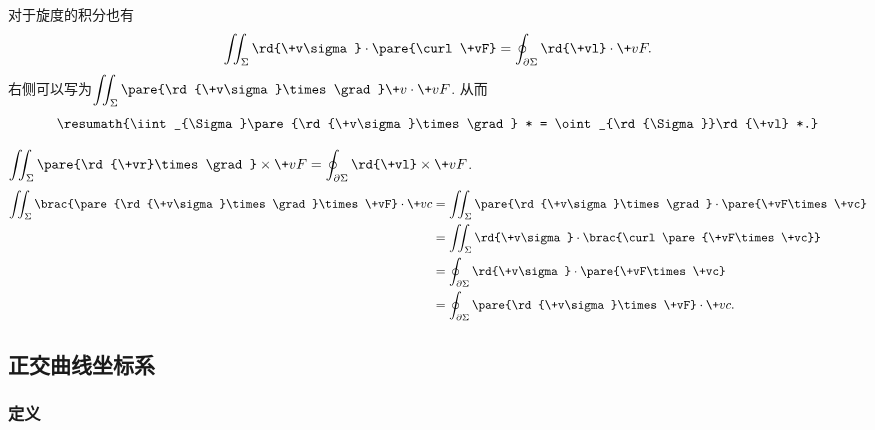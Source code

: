 \documentclass[hidelinks]{ctexart}
\begin{document}
\par
对于旋度的积分也有
\[ \iint_{\Sigma} \rd{\+v\sigma} \cdot\pare{\curl\+vF} = \oint_{\partial\Sigma} \rd{\+vl}\cdot \+vF. \]
右侧可以写为$\displaystyle \iint_{\Sigma} \pare{\rd{\+v\sigma}\times \grad}\+v\cdot \+vF$. 从而
\[ \resumath{\iint_{\Sigma}\pare{\rd{\+v\sigma}\times\grad} * = \oint_{\rd{\Sigma}}\rd{\+vl} *.} \]
\begin{ex}
    $\displaystyle \iint_{\Sigma} \pare{\rd{\+vr}\times\grad}\times\+vF = \oint_{\partial \Sigma} \rd{\+vl}\times \+vF$.
    \begin{align*}
        \iint_{\Sigma} \brac{\pare{\rd{\+v\sigma}\times\grad}\times \+vF}\cdot \+vc &= \iint_{\Sigma} \pare{\rd{\+v\sigma}\times \grad} \cdot \pare{\+vF\times \+vc} \\
        &= \iint_{\Sigma} \rd{\+v\sigma} \cdot \brac{\curl\pare{\+vF\times \+vc}} \\
        &= \oint_{\partial \Sigma} \rd{\+v\sigma}\cdot\pare{\+vF\times \+vc} \\
        &= \oint_{\partial \Sigma}\pare{\rd{\+v\sigma}\times \+vF} \cdot \+vc.
    \end{align*}
\end{ex}



\subsection{正交曲线坐标系} %
\label{sub:正交曲线坐标系}

\subsubsection{定义} %
\label{ssub:定义}
\end{document}
